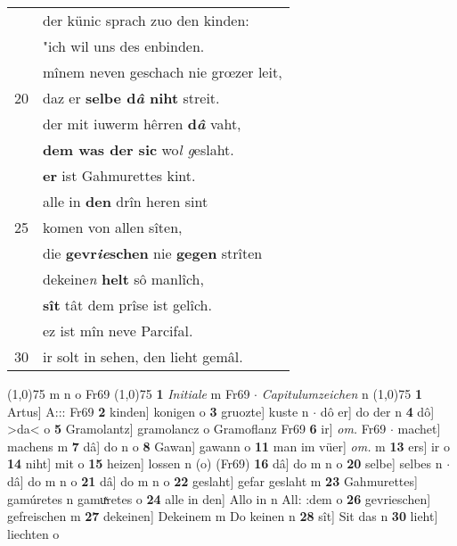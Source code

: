 \documentclass[8pt,a4paper,notitlepage]{article}
\begin{document}
\begin{table}[ht]
\begin{minipage}[t]{0.5\linewidth}
\begin{tabular}{rl}
 & der künic sprach zuo den kinden:\\ 
 & "ich wil uns des enbinden.\\ 
 & mînem neven geschach nie grœzer leit,\\ 
20 & daz er \textbf{selbe d\textit{â} niht} streit.\\ 
 & der mit iuwerm hêrren \textbf{d\textit{â}} vaht,\\ 
 & \textbf{dem was der sic} wo\textit{l g}eslaht.\\ 
 & \textbf{er} ist Gahmurettes kint.\\ 
 & alle in \textbf{den} drîn heren sint\\ 
25 & komen von allen sîten,\\ 
 & die \textbf{gevr\textit{ie}schen} nie \textbf{gegen} strîten\\ 
 & dekeine\textit{n} \textbf{helt} sô manlîch,\\ 
 & \textbf{sît} tât dem prîse ist gelîch.\\ 
 & ez ist mîn neve Parcifal.\\ 
30 & ir solt in sehen, den lieht gemâl.\\ 
\end{tabular}
\scriptsize
\line(1,0){75} \newline
m n o Fr69 \newline
\line(1,0){75} \newline
\textbf{1} \textit{Initiale} m Fr69   $\cdot$ \textit{Capitulumzeichen} n  \newline
\line(1,0){75} \newline
\textbf{1} Artus] A::: Fr69 \textbf{2} kinden] konigen o \textbf{3} gruozte] kuste n  $\cdot$ dô er] do der n \textbf{4} dô] >da< o \textbf{5} Gramolantz] gramolancz o Gramoflanz Fr69 \textbf{6} ir] \textit{om.} Fr69  $\cdot$ machet] machens m \textbf{7} dâ] do n o \textbf{8} Gawan] gawann o \textbf{11} man im vüer] \textit{om.} m \textbf{13} ers] ir o \textbf{14} niht] mit o \textbf{15} heizen] lossen n (o) (Fr69) \textbf{16} dâ] do m n o \textbf{20} selbe] selbes n  $\cdot$ dâ] do m n o \textbf{21} dâ] do m n o \textbf{22} geslaht] gefar geslaht m \textbf{23} Gahmurettes] gamúretes n gamuͯretes o \textbf{24} alle in den] Allo in n All: :dem o \textbf{26} gevrieschen] gefreischen m \textbf{27} dekeinen] Dekeinem m Do keinen n \textbf{28} sît] Sit das n \textbf{30} lieht] liechten o \newline
\end{minipage}
\end{table}
\newpage
\end{document}
